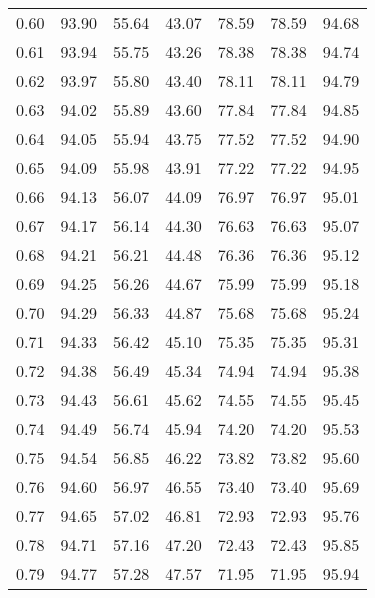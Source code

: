 \begin{tabular}{|c|c|c|c|c|c|c|}
      0.60 &     93.90 &     55.64 &      43.07 &   78.59 &      78.59 &         94.68 \\
      0.61 &     93.94 &     55.75 &      43.26 &   78.38 &      78.38 &         94.74 \\
      0.62 &     93.97 &     55.80 &      43.40 &   78.11 &      78.11 &         94.79 \\
      0.63 &     94.02 &     55.89 &      43.60 &   77.84 &      77.84 &         94.85 \\
      0.64 &     94.05 &     55.94 &      43.75 &   77.52 &      77.52 &         94.90 \\
      0.65 &     94.09 &     55.98 &      43.91 &   77.22 &      77.22 &         94.95 \\
      0.66 &     94.13 &     56.07 &      44.09 &   76.97 &      76.97 &         95.01 \\
      0.67 &     94.17 &     56.14 &      44.30 &   76.63 &      76.63 &         95.07 \\
      0.68 &     94.21 &     56.21 &      44.48 &   76.36 &      76.36 &         95.12 \\
      0.69 &     94.25 &     56.26 &      44.67 &   75.99 &      75.99 &         95.18 \\
      0.70 &     94.29 &     56.33 &      44.87 &   75.68 &      75.68 &         95.24 \\
      0.71 &     94.33 &     56.42 &      45.10 &   75.35 &      75.35 &         95.31 \\
      0.72 &     94.38 &     56.49 &      45.34 &   74.94 &      74.94 &         95.38 \\
      0.73 &     94.43 &     56.61 &      45.62 &   74.55 &      74.55 &         95.45 \\
      0.74 &     94.49 &     56.74 &      45.94 &   74.20 &      74.20 &         95.53 \\
      0.75 &     94.54 &     56.85 &      46.22 &   73.82 &      73.82 &         95.60 \\
      0.76 &     94.60 &     56.97 &      46.55 &   73.40 &      73.40 &         95.69 \\
      0.77 &     94.65 &     57.02 &      46.81 &   72.93 &      72.93 &         95.76 \\
      0.78 &     94.71 &     57.16 &      47.20 &   72.43 &      72.43 &         95.85 \\
      0.79 &     94.77 &     57.28 &      47.57 &   71.95 &      71.95 &         95.94 \\

\end{tabular}
